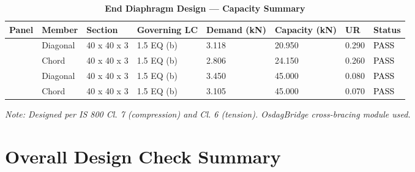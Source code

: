 \documentclass[12pt,a4paper]{report}
\numberwithin{table}{chapter}
\numberwithin{figure}{chapter}
\begin{document}
\vspace{1em}

\begin{longtable}{|C{2.0cm}|L{1.8cm}|C{2.2cm}|C{3.0cm}|C{1.8cm}|C{1.8cm}|C{1.2cm}|C{1.8cm}|}
\caption{\textbf{End Diaphragm Design --- Capacity Summary}}
\hline
\textbf{Panel} & \textbf{Member} & \textbf{Section} & \textbf{Governing LC} & \textbf{Demand (kN)} & \textbf{Capacity (kN)} & \textbf{UR} & \textbf{Status} \\[6pt]
\hline
{} & Diagonal & 40 x 40 x 3 & 1.5 EQ (b) & 3.118 & 20.950 & 0.290 & \textcolor{black}{PASS} \\[6pt]
 & Chord & 40 x 40 x 3 & 1.5 EQ (b) & 2.806 & 24.150 & 0.260 & \textcolor{black}{PASS} \\[6pt]
\hline
{} & Diagonal & 40 x 40 x 3 & 1.5 EQ (b) & 3.450 & 45.000 & 0.080 & \textcolor{black}{PASS} \\[6pt]
 & Chord & 40 x 40 x 3 & 1.5 EQ (b) & 3.105 & 45.000 & 0.070 & \textcolor{black}{PASS} \\[6pt]
\hline
\end{longtable}
\noindent\textit{Note: Designed per IS 800 Cl. 7 (compression) and Cl. 6 (tension). OsdagBridge cross-bracing module used.}

\section{Overall Design Check Summary}
\label{sec:overall-summary}
\end{document}
